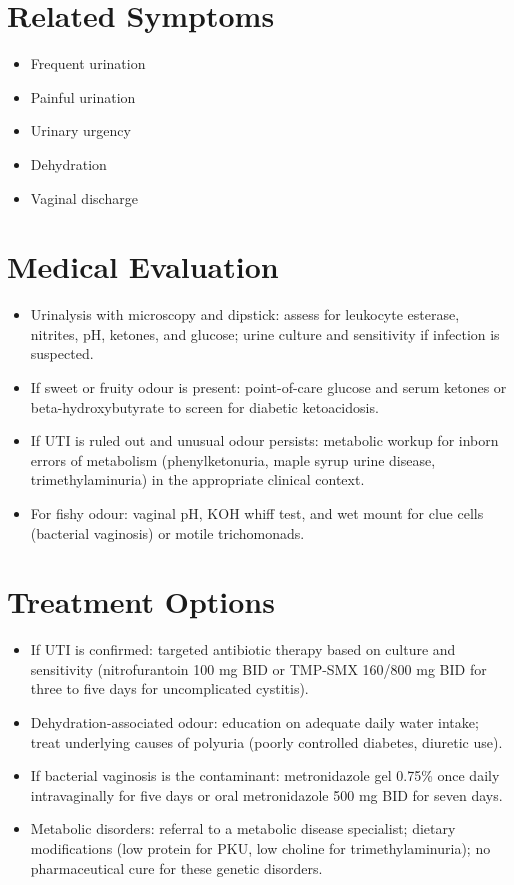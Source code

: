 \section*{Related Symptoms}
\begin{itemize}
  \item Frequent urination
  \item Painful urination
  \item Urinary urgency
  \item Dehydration
  \item Vaginal discharge
\end{itemize}


\section*{Medical Evaluation}
\begin{itemize}
  \item Urinalysis with microscopy and dipstick: assess for leukocyte esterase, nitrites, pH, ketones, and glucose; urine culture and sensitivity if infection is suspected.
  \item If sweet or fruity odour is present: point-of-care glucose and serum ketones or beta-hydroxybutyrate to screen for diabetic ketoacidosis.
  \item If UTI is ruled out and unusual odour persists: metabolic workup for inborn errors of metabolism (phenylketonuria, maple syrup urine disease, trimethylaminuria) in the appropriate clinical context.
  \item For fishy odour: vaginal pH, KOH whiff test, and wet mount for clue cells (bacterial vaginosis) or motile trichomonads.
\end{itemize}

\section*{Treatment Options}
\begin{itemize}
  \item If UTI is confirmed: targeted antibiotic therapy based on culture and sensitivity (nitrofurantoin 100 mg BID or TMP-SMX 160/800 mg BID for three to five days for uncomplicated cystitis).
  \item Dehydration-associated odour: education on adequate daily water intake; treat underlying causes of polyuria (poorly controlled diabetes, diuretic use).
  \item If bacterial vaginosis is the contaminant: metronidazole gel 0.75\% once daily intravaginally for five days or oral metronidazole 500 mg BID for seven days.
  \item Metabolic disorders: referral to a metabolic disease specialist; dietary modifications (low protein for PKU, low choline for trimethylaminuria); no pharmaceutical cure for these genetic disorders.
\end{itemize}

